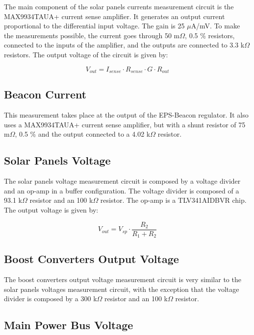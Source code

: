 The main component of the solar panels currents measurement circuit is the MAX9934TAUA+ current sense amplifier. It generates an output current proportional to the differential input voltage. The gain is 25 $\mu$A/mV. To make the measurements possible, the current goes through 50 m$\Omega$, 0.5 \% resistors, connected to the inputs of the amplifier, and the outputs are connected to 3.3 k$\Omega$ resistors. The output voltage of the circuit is given by:

\begin{equation}
V_{out} = I_{sense} \cdot R_{sense} \cdot G \cdot R_{out}
\end{equation}

\subsection{Beacon Current}

This measurement takes place at the output of the EPS-Beacon regulator. It also uses a MAX9934TAUA+ current sense amplifier, but with a shunt resistor of 75 m$\Omega$, 0.5 \% and the output connected to a 4.02 k$\Omega$ resistor.

\subsection{Solar Panels Voltage}

The solar panels voltage measurement circuit is composed by a voltage divider and an op-amp in a buffer configuration. The voltage divider is composed of a 93.1 k$\Omega$ resistor and an 100 k$\Omega$ resistor. The op-amp is a TLV341AIDBVR chip. The output voltage is given by:

\begin{equation}
V_{out} = V_{sp} \cdot \frac{R_{2}}{R_{1} + R_{2}}
\end{equation}

\subsection{Boost Converters Output Voltage}

The boost converters output voltage measurement circuit is very similar to the solar panels voltages measurement circuit, with the exception that the voltage divider is composed by a 300 k$\Omega$ resistor and an 100 k$\Omega$ resistor.

\subsection{Main Power Bus Voltage}

